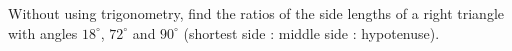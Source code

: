 Without using trigonometry, find the ratios of the side lengths of a right triangle with angles $18^\circ$, $72^\circ$ and $90^\circ$ (shortest side : middle side : hypotenuse).
